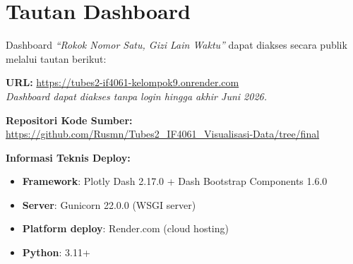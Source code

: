 \chapter{Tautan Dashboard}

Dashboard \textit{``Rokok Nomor Satu, Gizi Lain Waktu''} dapat diakses secara publik melalui tautan berikut:

\begin{tcolorbox}[colback=gray!10, colframe=gold, title=\textbf{Tautan Dashboard Publik}]
\centering
\textbf{URL:} \href{https://tubes2-if4061-kelompok9.onrender.com}{https://tubes2-if4061-kelompok9.onrender.com}\\[6pt]
\small\textit{Dashboard dapat diakses tanpa login hingga akhir Juni 2026.}
\end{tcolorbox}

\vspace{12pt}

\textbf{Repositori Kode Sumber:}\\
\url{https://github.com/Rusmn/Tubes2_IF4061_Visualisasi-Data/tree/final}

\vspace{12pt}

\textbf{Informasi Teknis Deploy:}
\begin{itemize}
  \item \textbf{Framework}: Plotly Dash 2.17.0 + Dash Bootstrap Components 1.6.0
  \item \textbf{Server}: Gunicorn 22.0.0 (WSGI server)
  \item \textbf{Platform deploy}: Render.com (cloud hosting)
  \item \textbf{Python}: 3.11+
\end{itemize}
